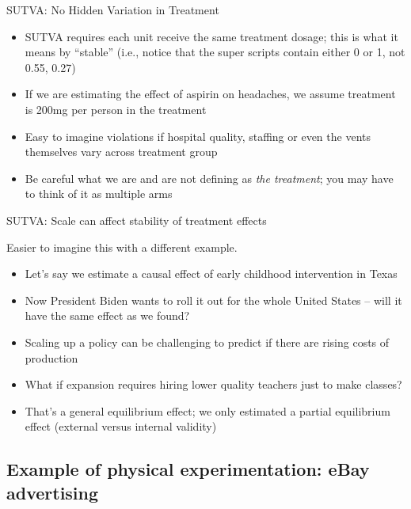 \documentclass{beamer}
\begin{document}
\begin{frame}{SUTVA: No Hidden Variation in Treatment}

  \begin{itemize}
    \item SUTVA requires each unit receive the same treatment dosage; this is what it means by ``stable'' (i.e., notice that the super scripts contain either 0 or 1, not 0.55, 0.27)
    \item If we are estimating the effect of aspirin on headaches, we assume treatment is 200mg per person in the treatment
    \item Easy to imagine violations if hospital quality, staffing or even the vents themselves vary across treatment group
    \item Be careful what we are and are not defining as \emph{the treatment}; you may have to think of it as multiple arms
  \end{itemize}
\end{frame}

\begin{frame}{SUTVA: Scale can affect stability of treatment effects}

  Easier to imagine this with a different example.
  \begin{itemize}
    \item Let's say we estimate a causal effect of early childhood intervention in Texas
    \item Now President Biden wants to roll it out for the whole United States -- will it have the same effect as we found?
    \item Scaling up a policy can be challenging to predict if there are rising costs of production
    \item What if expansion requires hiring lower quality teachers just to make classes?
    \item That's a general equilibrium effect; we only estimated a partial equilibrium effect (external versus internal validity)
  \end{itemize}
\end{frame}
% 

\subsection{Example of physical experimentation: eBay advertising}
\end{document}
